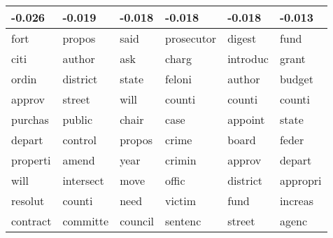 \begin{table}[ht]
\centering
\begin{tabular}{llllll}
  \hline
-0.026 & -0.019 & -0.018 & -0.018 & -0.018 & -0.013 \\ 
  \hline
fort & propos & said & prosecutor & digest & \cellcolor{blue!25} fund \\ 
  citi & author & ask & charg & introduc & \cellcolor{blue!25} grant \\ 
  ordin & district & state & feloni & author & \cellcolor{blue!25} budget \\ 
  approv & street & will & counti & counti & counti \\ 
  \cellcolor{blue!25} purchas & public & chair & case & appoint & state \\ 
  depart & control & propos & crime & board & feder \\ 
  properti & amend & year & crimin & approv & depart \\ 
  will & intersect & move & offic & district & appropri \\ 
  resolut & counti & need & victim & \cellcolor{blue!25} fund & increas  \\ 
  contract & committe & council & sentenc & street & agenc \\ 
   \hline
\end{tabular}
\label{tabSTMINDem}
\end{table}

